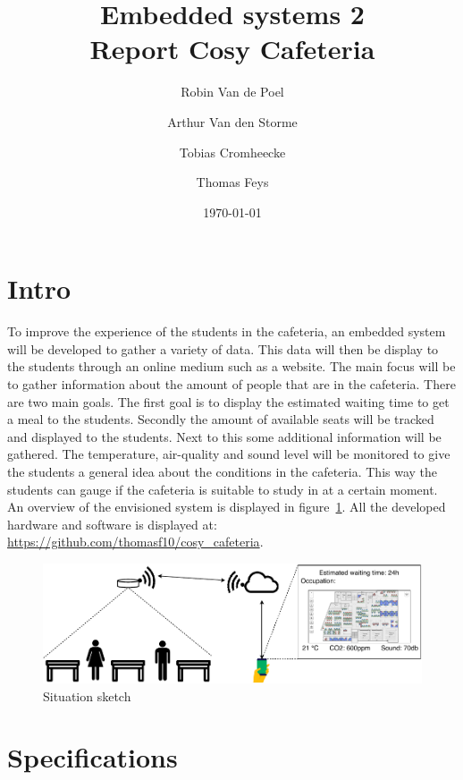 \documentclass[11pt,a4paper]{article}
\begin{document}
\title{Embedded systems 2\\
	\Huge Report Cosy Cafeteria
}
\author{Robin Van de Poel\and Arthur Van den Storme\and Tobias Cromheecke\and Thomas Feys}
\date{\today}
\maketitle
\newpage

\tableofcontents
\newpage

\section{Intro}
To improve the experience of the students in the cafeteria, an embedded system will be developed to gather a variety of data. This data will then be display to the students through an online medium such as a website. The main focus will be to gather information about the amount of people that are in the cafeteria. There are two main goals. The first goal is to display the estimated waiting time to get a meal to the students. Secondly the amount of available seats will be tracked and displayed to the students. Next to this some additional information will be gathered. The temperature, air-quality and sound level will be monitored to give the students a general idea about the conditions in the cafeteria. This way the students can gauge if the cafeteria is suitable to study in at a certain moment. An overview of the envisioned system is displayed in figure~\ref{fig:system}. All the developed hardware and software is displayed at: \url{https://github.com/thomasf10/cosy_cafeteria}.
\begin{figure}[H]
	\centering
	\includegraphics[width=1.0\linewidth]{situation.pdf}
	\caption{Situation sketch}
	\label{fig:system}
\end{figure}

\section{Specifications}
\end{document}
